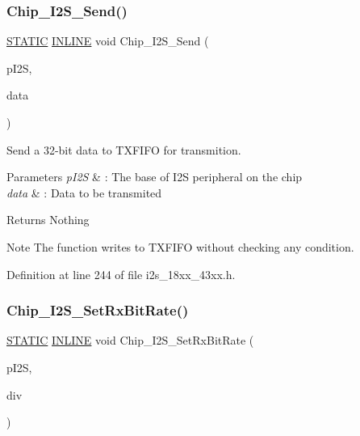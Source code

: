 \subsubsection{\texorpdfstring{Chip\+\_\+\+I2\+S\+\_\+\+Send()}{Chip\_I2S\_Send()}}
{\footnotesize\ttfamily \hyperlink{group___l_p_c___types___public___macros_ga10b2d890d871e1489bb02b7e70d9bdfb}{S\+T\+A\+T\+IC} \hyperlink{spifi__18xx__43xx_8h_a2eb6f9e0395b47b8d5e3eeae4fe0c116}{I\+N\+L\+I\+NE} void Chip\+\_\+\+I2\+S\+\_\+\+Send (\begin{DoxyParamCaption}\item[{\hyperlink{struct_l_p_c___i2_s___t}{L\+P\+C\+\_\+\+I2\+S\+\_\+T} $\ast$}]{p\+I2S,  }\item[{uint32\+\_\+t}]{data }\end{DoxyParamCaption})}



Send a 32-\/bit data to T\+X\+F\+I\+FO for transmition. 


\begin{DoxyParams}{Parameters}
{\em p\+I2S} & \+: The base of I2S peripheral on the chip \\
\hline
{\em data} & \+: Data to be transmited \\
\hline
\end{DoxyParams}
\begin{DoxyReturn}{Returns}
Nothing 
\end{DoxyReturn}
\begin{DoxyNote}{Note}
The function writes to T\+X\+F\+I\+FO without checking any condition. 
\end{DoxyNote}


Definition at line 244 of file i2s\+\_\+18xx\+\_\+43xx.\+h.

\mbox{\label{group___i2_s__18_x_x__43_x_x_gaf18685ebc3f86581fd7075fafe4c72e7}} 
\subsubsection{\texorpdfstring{Chip\+\_\+\+I2\+S\+\_\+\+Set\+Rx\+Bit\+Rate()}{Chip\_I2S\_SetRxBitRate()}}
{\footnotesize\ttfamily \hyperlink{group___l_p_c___types___public___macros_ga10b2d890d871e1489bb02b7e70d9bdfb}{S\+T\+A\+T\+IC} \hyperlink{spifi__18xx__43xx_8h_a2eb6f9e0395b47b8d5e3eeae4fe0c116}{I\+N\+L\+I\+NE} void Chip\+\_\+\+I2\+S\+\_\+\+Set\+Rx\+Bit\+Rate (\begin{DoxyParamCaption}\item[{\hyperlink{struct_l_p_c___i2_s___t}{L\+P\+C\+\_\+\+I2\+S\+\_\+T} $\ast$}]{p\+I2S,  }\item[{uint32\+\_\+t}]{div }\end{DoxyParamCaption})}



